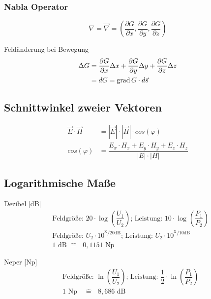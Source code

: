 \subsubsection*{Nabla Operator}
\[
    \nabla = \vec{\nabla} = \left( \dfrac{\partial G}{\partial x},
    \dfrac{\partial G}{\partial y}, \dfrac{\partial G}{\partial z} \right)
\]

Feldänderung bei Bewegung
\begin{align*}
    \Delta G & = \dfrac{\partial G}{\partial x} \Delta x + \dfrac{\partial G}{\partial y} \Delta y + \dfrac{\partial G}{\partial z} \Delta z \\
             & = dG = \operatorname{grad} G \cdot d \vec{s}
\end{align*}

\subsection{Schnittwinkel zweier Vektoren}
\begin{align*}
    \vec{E} \cdot \vec{H} & = |\vec{E}| \cdot |\vec{H}| \cdot cos(\varphi)                         \\
    cos(\varphi)          & = \dfrac{E_x \cdot H_x + E_y \cdot H_y + E_z \cdot H_z}{|E| \cdot |H|}
\end{align*}

\subsection{Logarithmische Maße}
\begin{description}
    \item Dezibel [dB]
          \begin{align*}
            & \text{Feldgrö{\ss}e: } 20 \cdot \log_{} \left( \dfrac{U_1}{U_2}\right) \text{; }
            \text{Leistung: } 10 \cdot \log_{} \left( \dfrac{P_1}{P_2}\right)\\
            & \text{Feldgrö{\ss}e: } U_2 \cdot 10^{^\text{X}/\text{20dB}}\text{; }
              \text{Leistung: } U_2 \cdot  10^{^\text{X}/\text{10dB}}\\
            & 1 \text{ dB } \hat{=} \text{ } 0,1151 \text{ Np}
          \end{align*}

    \item Neper [Np]
          \begin{align*}
            & \text{Feldgrö{\ss}e: } \ln \left(\dfrac{U_1}{U_2}\right) \text{; }                                                                            
             \text{Leistung: } \dfrac{1}{2} \cdot \ln \left(\dfrac{P_1}{P_2}\right)\\
            &1 \text{ Np } \text{ } \hat{=} \text{ } 8,686 \text{ dB} %
          \end{align*}
\end{description}

